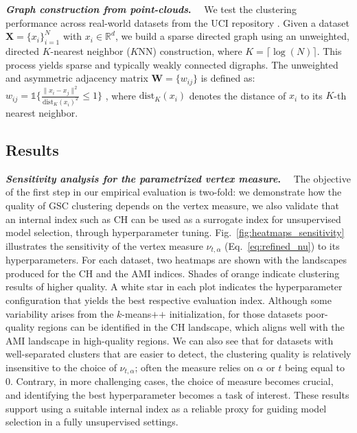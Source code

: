 \documentclass[10pt]{article} %
\def\rmW{{\mathbf{W}}}
\newcommand{\GSC}{GSC\xspace}
\newcommand{\inlinetitle}[2]{\noindent\textbf{\textit{#1}{#2}}~~}
\begin{document}
\inlinetitle{Graph construction from point-clouds}{.}%
We test the clustering performance across %
real-world datasets from the UCI repository \citep{dheeru2017uci}. Given a dataset $\boldsymbol{X} = \{x_i\}_{i=1}^N$ with $x_i \in \mathbb{R}^d$, we build a sparse directed graph using an unweighted, directed $K$-nearest neighbor ($K$NN) construction, where $K = \lceil \log(N) \rceil$. This process yields sparse and typically weakly connected digraphs.
The unweighted and asymmetric adjacency matrix $\rmW = \{w_{ij}\}$ is defined as: %
$
w_{ij} = \mathds{1}\big\{ \frac{\|x_i - x_j\|^2}{\text{dist}_K(x_i)^2} \leq 1 \big\}
$%
, where $\text{dist}_K (x_i)$ denotes the distance of $x_i$ to its $K$-th nearest neighbor.

\subsection{Results}

\inlinetitle{Sensitivity analysis for the parametrized vertex measure}{.}%
The objective of the first step in our empirical evaluation is two-fold: we demonstrate how the quality of \GSC clustering depends on the vertex measure, we also validate that an internal index such as CH can be used as a surrogate index for unsupervised model selection, through hyperparameter tuning. Fig.~\ref{fig:heatmaps_sensitivity} illustrates the sensitivity of the vertex measure $\nu_{t,\alpha}$ (Eq.~\ref{eq:refined_nu}) to its hyperparameters. For each dataset, two heatmaps are shown with the landscapes produced for the CH and the AMI indices. Shades of orange indicate clustering results of higher quality. A white star in each plot indicates the hyperparameter configuration that yields the best respective evaluation index. Although some variability arises from the $k$-means$\texttt{++}$ initialization, for those datasets poor-quality regions can be identified in the CH landscape, which aligns well with the AMI landscape in high-quality regions.
We can also see that for datasets with well-separated clusters that are easier to detect, the clustering quality is relatively insensitive to the choice of $\nu_{t,\alpha}$; often the measure relies on $\alpha$ or $t$ being equal to $0$. Contrary, in more challenging cases, the choice of measure becomes crucial, and identifying the best hyperparameter becomes a task of interest. These results support using a suitable internal index as a reliable proxy for guiding model selection in a fully unsupervised settings.
%
\end{document}
